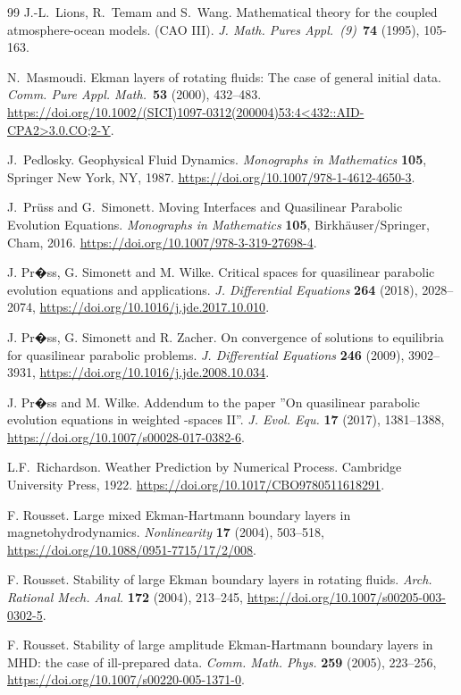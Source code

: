 \documentclass[preprint]{elsarticle}
\numberwithin{equation}{section}
\begin{document}
\begin{thebibliography}{99}
	J.-L.~Lions, R.~Temam and S.~Wang.
	Mathematical theory for the coupled atmosphere-ocean models. (CAO III).
	\textit{J. Math. Pures Appl.~(9)}~\textbf{74} (1995), 105-163. 
	
	N.~Masmoudi.
	Ekman layers of rotating fluids: The case of general initial data.
	\textit{Comm. Pure Appl. Math.}~\textbf{53} (2000), 432--483. 
	\url{https://doi.org/10.1002/(SICI)1097-0312(200004)53:4<432::AID-CPA2>3.0.CO;2-Y}.
	
	J.~Pedlosky.
	Geophysical Fluid Dynamics. \textit{Monographs in Mathematics} \textbf{105}, Springer New York, NY, 1987.
	\url{https://doi.org/10.1007/978-1-4612-4650-3}.
	
	J.~Pr\"uss and G.~Simonett.
	Moving Interfaces and Quasilinear Parabolic Evolution Equations. \textit{Monographs in Mathematics} \textbf{105}, Birkh\"auser/Springer, Cham, 2016.
	\url{https://doi.org/10.1007/978-3-319-27698-4}.
	
	
	J. Pr�ss, G. Simonett and M. Wilke.
	Critical spaces for quasilinear parabolic evolution equations and applications.
	\textit{J. Differential Equations} \textbf{264} (2018), 2028--2074,
	\url{https://doi.org/10.1016/j.jde.2017.10.010}.
	
	
	J. Pr�ss, G. Simonett and R. Zacher.
	On convergence of solutions to equilibria for quasilinear
	parabolic problems.
	\textit{J. Differential Equations} \textbf{246} (2009),  3902--3931,
	\url{https://doi.org/10.1016/j.jde.2008.10.034}.
	
	
	J. Pr�ss and M. Wilke.
	Addendum to the paper ''On quasilinear parabolic evolution equations in weighted 
	-spaces II''.
	\textit{J. Evol. Equ.} \textbf{17} (2017), 1381--1388,
	\url{https://doi.org/10.1007/s00028-017-0382-6}.
	
	L.F.~Richardson.
	Weather Prediction by Numerical Process. 
	Cambridge University Press, 1922.
	\url{https://doi.org/10.1017/CBO9780511618291}.
	
	F. Rousset.
	Large mixed Ekman-Hartmann boundary layers in magnetohydrodynamics.
	\textit{Nonlinearity} \textbf{17} (2004), 503--518,
	\url{https://doi.org/10.1088/0951-7715/17/2/008}.
	
	F. Rousset.
	Stability of large Ekman boundary layers in rotating fluids.
	\textit{Arch. Rational Mech.
		Anal.} \textbf{172} (2004), 213--245,
	\url{https://doi.org/10.1007/s00205-003-0302-5}.
	
	F. Rousset.
	Stability of large amplitude Ekman-Hartmann boundary layers in MHD: the case
	of ill-prepared data.
	\textit{Comm. Math. Phys.} \textbf{259} (2005), 223--256,
	\url{https://doi.org/10.1007/s00220-005-1371-0}.
	
\end{thebibliography}	
\end{document}

